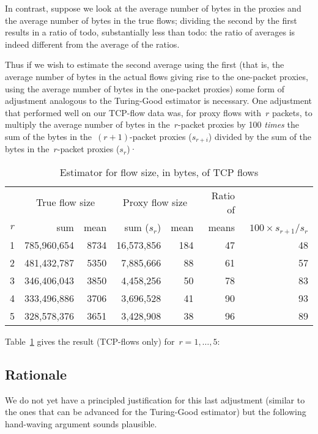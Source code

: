 \documentclass{paper}
\begin{document}
In contrast, suppose we look at the average number of bytes in the proxies and
the average number of bytes in the true flows; dividing the second by the first
results in a ratio of todo, substantially less than todo: the ratio of averages
is indeed different from the average of the ratios.

Thus if we wish to estimate the second average using the first (that is, the
average number of bytes in the actual flows giving rise to the one-packet
proxies, using the average number of bytes in the one-packet proxies) some form
of adjustment analogous to the Turing-Good estimator is necessary. One
adjustment that performed well on our TCP-flow data was, for proxy flows
with~$r$ packets, to multiply the average number of bytes in the~$r$-packet
proxies by 100 \emph{times} the sum of the bytes in the~$(r + 1)$-packet proxies
($s_{r+i}$) divided by the sum of the bytes in the~$r$-packet proxies ($s_r$)·

\begin{table}
\begin{center}
\begin{tabular}{r@{\hskip 1.7em}r r@{\hskip 1.7em}r r@{\hskip 1.7em}r r}
    & \multicolumn{2}{c}{True flow size} & \multicolumn{2}{c}{Proxy flow size} & Ratio of & \\
$r$ & sum & mean & sum ($s_r$) & mean & means &~$100 \times s_{r+1}/s_r$ \\
\midrule
1 & 785,960,654 & 8734 & 16,573,856 & 184 & 47 & 48 \\
2 & 481,432,787 & 5350 &  7,885,666 &  88 & 61 & 57 \\
3 & 346,406,043 & 3850 &  4,458,256 &  50 & 78 & 83 \\
4 & 333,496,886 & 3706 &  3,696,528 &  41 & 90 & 93 \\
5 & 328,578,376 & 3651 &  3,428,908 &  38 & 96 & 89 \\
\end{tabular}
\caption{Estimator for flow size, in bytes, of TCP flows}
\label{size_est}
\end{center}
\end{table}

Table~\ref{size_est} gives the result (TCP-flows only) for~$r = 1, \dots, 5$:

\subsection{Rationale}

We do not yet have a principled justification for this last adjustment (similar
to the ones that can be advanced for the Turing-Good estimator) but the
following hand-waving argument sounds plausible.
\end{document}
